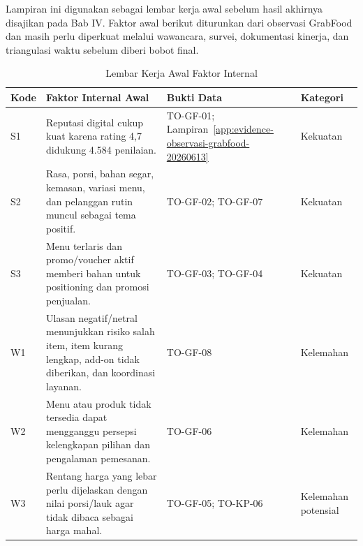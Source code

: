 \label{app:template-ifas-efas-swot}

Lampiran ini digunakan sebagai lembar kerja awal sebelum hasil akhirnya disajikan pada Bab IV. Faktor awal berikut diturunkan dari observasi GrabFood dan masih perlu diperkuat melalui wawancara, survei, dokumentasi kinerja, dan triangulasi waktu sebelum diberi bobot final.

\begin{table}[!htbp]
    \centering
    \caption{Lembar Kerja Awal Faktor Internal}
    \label{tab:lembar-kerja-faktor-internal}
    \scriptsize
    \setlength{\tabcolsep}{3pt}
    \renewcommand{\arraystretch}{0.92}
    \begin{tabularx}{\textwidth}{|Z{1cm}|Y|Y|Z{2cm}|}
        \toprule
        \textbf{Kode} & \textbf{Faktor Internal Awal} & \textbf{Bukti Data} & \textbf{Kategori} \\ \hline
        \midrule
        S1 & Reputasi digital cukup kuat karena rating 4,7 didukung 4.584 penilaian. & TO-GF-01; Lampiran~\ref{app:evidence-observasi-grabfood-20260613} & Kekuatan \\ \hline
        S2 & Rasa, porsi, bahan segar, kemasan, variasi menu, dan pelanggan rutin muncul sebagai tema positif. & TO-GF-02; TO-GF-07 & Kekuatan \\ \hline
        S3 & Menu terlaris dan promo/voucher aktif memberi bahan untuk positioning dan promosi penjualan. & TO-GF-03; TO-GF-04 & Kekuatan \\ \hline
        W1 & Ulasan negatif/netral menunjukkan risiko salah item, item kurang lengkap, add-on tidak diberikan, dan koordinasi layanan. & TO-GF-08 & Kelemahan \\ \hline
        W2 & Menu atau produk tidak tersedia dapat mengganggu persepsi kelengkapan pilihan dan pengalaman pemesanan. & TO-GF-06 & Kelemahan \\ \hline
        W3 & Rentang harga yang lebar perlu dijelaskan dengan nilai porsi/lauk agar tidak dibaca sebagai harga mahal. & TO-GF-05; TO-KP-06 & Kelemahan potensial \\ \hline
        \bottomrule
    \end{tabularx}
\end{table}

